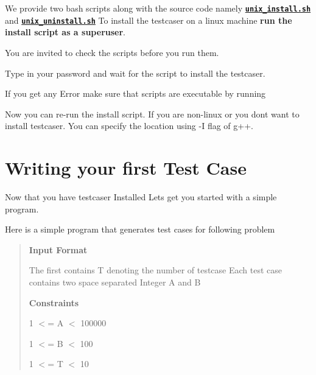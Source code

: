 We provide two bash scripts along with the source code namely 
\href{https://github.com/coder3101/testcaser/blob/master/unix_install.sh}{\texttt{ {\bfseries{unix\+\_\+install.\+sh}}}} and 
\href{https://github.com/coder3101/testcaser/blob/master/unix_uninstall.sh}{\texttt{ {\bfseries{unix\+\_\+uninstall.\+sh}}}} To install the testcaser on a linux machine {\bfseries{run the install script as a superuser}}.

You are invited to check the scripts before you run them.


\begin{DoxyCode}{0}
\end{DoxyCode}


Type in your password and wait for the script to install the testcaser.

If you get any Error make sure that scripts are executable by running 
\begin{DoxyCode}{0}
\end{DoxyCode}


Now you can re-\/run the install script. If you are non-\/linux or you don\textquotesingle{}t want to install testcaser. You can specify the location using {\ttfamily -\/I} flag of {\ttfamily g++}.\hypertarget{index_started}{}\section{Writing your first Test Case}\label{index_started}
Now that you have testcaser Installed Let\textquotesingle{}s get you started with a simple program.

Here is a simple program that generates test cases for following problem \begin{quote}
{\bfseries{Input Format}}

The first contains T denoting the number of testcase Each test case contains two space separated Integer A and B

{\bfseries{Constraints}}

1 $<$= A $<$ 100000

1 $<$= B $<$ 100

1 $<$= T $<$ 10 \end{quote}



